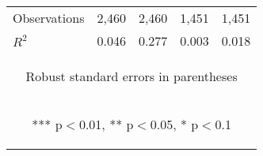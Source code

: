 \begin{center}
\begin{tabular}{lcccc}
Observations & 2,460 & 2,460 & 1,451 & 1,451 \\
 $R^2$ & 0.046 & 0.277 & 0.003 & 0.018 \\ \hline
\multicolumn{5}{c}{\begin{footnotesize} Robust standard errors in parentheses\end{footnotesize}} \\
\multicolumn{5}{c}{\begin{footnotesize} *** p$<$0.01, ** p$<$0.05, * p$<$0.1\end{footnotesize}} \\
\end{tabular}
\end{center}

